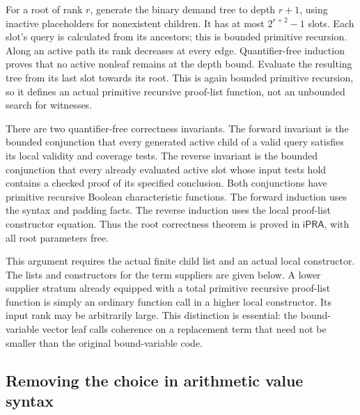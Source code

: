 For a root of rank $r$, generate the binary demand tree to depth $r+1$,
using inactive placeholders for nonexistent children.  It has at most
$2^{r+2}-1$ slots.  Each slot's query is calculated from its ancestors;
this is bounded primitive recursion.  Along an active path its rank
decreases at every edge.  Quantifier-free induction proves that no
active nonleaf remains at the depth bound.  Evaluate the resulting tree
from its last slot towards its root.  This is again bounded primitive
recursion, so it defines an actual primitive recursive proof-list
function, not an unbounded search for witnesses.

There are two quantifier-free correctness invariants.  The forward
invariant is the bounded conjunction that every generated active child
of a valid query satisfies its local validity and coverage tests.  The
reverse invariant is the bounded conjunction that every already
evaluated active slot whose input tests hold contains a checked proof
of its specified conclusion.  Both conjunctions have primitive
recursive Boolean characteristic functions.  The forward induction
uses the syntax and padding facts.  The reverse induction uses the
local proof-list constructor equation.  Thus the root correctness
theorem is proved in $\mathsf{iPRA}$, with all root parameters free.

This argument requires the actual finite child list and an actual local
constructor.  The lists and constructors for the term suppliers are
given below.  A lower supplier stratum already equipped with a total
primitive recursive proof-list function is simply an ordinary function
call in a higher local constructor.  Its input rank may be arbitrarily
large.  This distinction is essential: the bound-variable vector leaf
calls coherence on a replacement term that need not be smaller than
the original bound-variable code.

\subsection{Removing the choice in arithmetic value syntax}

